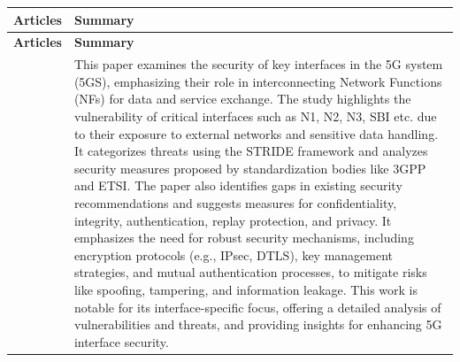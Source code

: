 \documentclass{report}
\begin{document}
\begin{longtable}{|p{4cm}|p{12cm}|}
    \hline
    \textbf{Articles} & \textbf{Summary} \\ 
    \hline
    \endfirsthead %
    \hline
    \textbf{Articles} & \textbf{Summary}  \\ 
    \hline
    \endhead %
    \hline
    \endfoot
    \hline
    \endlastfoot
    
    \cite{mahyoub2024security} & This paper examines the security of key interfaces in the 5G system (5GS), emphasizing their role in interconnecting Network Functions (NFs) for data and service exchange. The study highlights the vulnerability of critical interfaces such as N1, N2, N3, SBI etc. due to their exposure to external networks and sensitive data handling. It categorizes threats using the STRIDE framework and analyzes security measures proposed by standardization bodies like 3GPP and ETSI.
    The paper also identifies gaps in existing security recommendations and suggests measures for confidentiality, integrity, authentication, replay protection, and privacy. It emphasizes the need for robust security mechanisms, including encryption protocols (e.g., IPsec, DTLS), key management strategies, and mutual authentication processes, to mitigate risks like spoofing, tampering, and information leakage.
    This work is notable for its interface-specific focus, offering a detailed analysis of vulnerabilities and threats, and providing insights for enhancing 5G interface security. \\
    \hline


\end{longtable}
\end{document}

